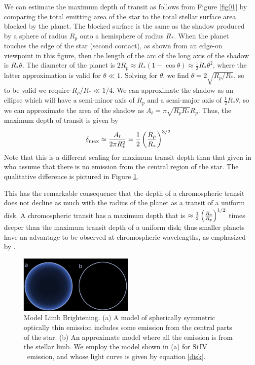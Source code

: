 \documentclass[manuscript]{aastex}
\newcommand{\oi}{\ensuremath{\mathrm{O}\,\scriptstyle \mathrm{I}}}
\newcommand{\siIV}{\ensuremath{\mathrm{Si}\,\scriptstyle \mathrm{IV}}}
\begin{document}
We can estimate the maximum depth of transit as follows from
Figure \ref{fig01} by comparing the total emitting area of the star to the total stellar surface area blocked by the planet. The blocked surface is the same as the shadow produced by a sphere of radius $R_p$ onto a hemisphere of radius $R_*$. When the planet touches the edge of the star 
(second contact), as shown from an edge-on viewpoint in this figure,
then the length of the arc of the long axis of the shadow is
$R_*\theta$.  The diameter of the planet is 
$2 R_p \approx R_*(1-\cos{\theta}) \approx \frac{1}{2} R_* \theta^2$,
where the latter approximation is valid for $\theta \ll 1$.
Solving for $\theta$, we find $\theta = 2\sqrt{R_p/R_*}$, so to
be valid we require $R_p/R_* \ll 1/4$.  We can approximate
the shadow as an ellipse which will have a semi-minor axis of $R_p$
and a semi-major axis of $\frac{1}{2} R_*\theta$, so we can approximate the
area of the shadow as $A_t = \pi \sqrt{R_pR_*} R_p$.  Thus,
the maximum depth of transit is given by 
\begin{equation} \label{depth_anal}
\delta_{\mathrm{max}} \approx {A_t \over 2 \pi R_*^2} = \frac{1}{2} \left({R_p \over R_*}\right)^{3/2}
\end{equation}
Note that this is a different scaling for maximum transit depth than that given in \citet{assef} who assume that there is no emission from the central region of the star. The qualitative difference is pictured in Figure \ref{limbmodel}.


This has the remarkable consequence that the depth of a chromospheric
transit does not decline as much with the radius of the planet as 
a transit of a uniform disk.  A chromospheric transit has a maximum
depth that is $\approx \frac{1}{2} \left({R_* \over R_p}\right)^{1/2}$
times deeper than the maximum transit depth of a uniform disk;
thus smaller planets have an advantage to be observed at
chromospheric wavelengths, as emphasized by \citet{assef}.

\begin{figure}
\begin{center}
\includegraphics[width=0.5\textwidth]{model_comparison.eps}
\caption{Model Limb Brightening. (a) A model of spherically symmetric optically thin emission includes some emission from the central parts of the star. (b) An approximate model where all the emission is from the stellar limb. We employ the model shown in (a) for \siIV\ emission, and whose light curve is given by  equation \ref{disk}.}
\label{limbmodel}
\end{center}
\end{figure}
\end{document}
